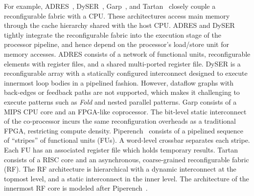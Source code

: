 For example, ADRES~\cite{adres}, DySER~\cite{dyser}, Garp~\cite{garp}, and Tartan~\cite{tartan} closely couple a reconfigurable fabric with a CPU. These architectures access main memory through the cache hierarchy shared with the host CPU. ADRES and DySER tightly integrate the reconfigurable fabric into the execution stage of the processor pipeline, and hence depend on the processor's load/store unit for memory accesses. ADRES consists of a network of functional units, reconfigurable elements with register files, and a shared multi-ported register file.
DySER is a reconfigurable array with a statically configured interconnect designed to execute innermost loop bodies in a pipelined fashion. However, dataflow graphs with back-edges or feedback paths are not supported, which makes it challenging to execute patterns such as \emph{Fold} and nested parallel patterns.  Garp consists of a MIPS CPU core and an FPGA-like coprocessor. The bit-level static interconnect of the co-processor incurs the same reconfiguration overheads as a traditional FPGA, restricting compute density.
Piperench~\cite{piperench} consists of a pipelined sequence of ``stripes'' of functional units (FUs).  A word-level crossbar separates each stripe. Each FU has an associated register file which holds temporary results.  Tartan consists of a RISC core and an asynchronous, coarse-grained reconfigurable fabric (RF).  The RF architecture is hierarchical with a dynamic interconnect at the topmost level, and a static interconnect in the inner level. The architecture of the innermost RF core is modeled after Piperench~\cite{piperench}.




